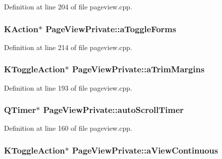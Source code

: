 Definition at line 204 of file pageview.\+cpp.

\hypertarget{classPageViewPrivate_af0990514eb2a448c1400a4cecc0ca6bb}{
\subsubsection[{a\+Toggle\+Forms}]{\setlength{\rightskip}{0pt plus 5cm}K\+Action$\ast$ Page\+View\+Private\+::a\+Toggle\+Forms}}\label{classPageViewPrivate_af0990514eb2a448c1400a4cecc0ca6bb}


Definition at line 214 of file pageview.\+cpp.

\hypertarget{classPageViewPrivate_a0ef5e6fe307660bd3fbe6bd999b895a7}{
\subsubsection[{a\+Trim\+Margins}]{\setlength{\rightskip}{0pt plus 5cm}K\+Toggle\+Action$\ast$ Page\+View\+Private\+::a\+Trim\+Margins}}\label{classPageViewPrivate_a0ef5e6fe307660bd3fbe6bd999b895a7}


Definition at line 193 of file pageview.\+cpp.

\hypertarget{classPageViewPrivate_afe16a683945c2e7edf9906eb30ad6d8b}{
\subsubsection[{auto\+Scroll\+Timer}]{\setlength{\rightskip}{0pt plus 5cm}Q\+Timer$\ast$ Page\+View\+Private\+::auto\+Scroll\+Timer}}\label{classPageViewPrivate_afe16a683945c2e7edf9906eb30ad6d8b}


Definition at line 160 of file pageview.\+cpp.

\hypertarget{classPageViewPrivate_a9b68e639f07533308f37c0e1654a9c9a}{
\subsubsection[{a\+View\+Continuous}]{\setlength{\rightskip}{0pt plus 5cm}K\+Toggle\+Action$\ast$ Page\+View\+Private\+::a\+View\+Continuous}}\label{classPageViewPrivate_a9b68e639f07533308f37c0e1654a9c9a}


